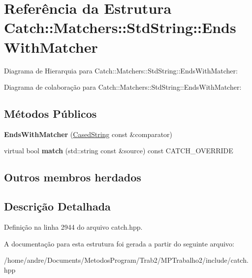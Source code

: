 \hypertarget{structCatch_1_1Matchers_1_1StdString_1_1EndsWithMatcher}{}\section{Referência da Estrutura Catch\+:\+:Matchers\+:\+:Std\+String\+:\+:Ends\+With\+Matcher}
\label{structCatch_1_1Matchers_1_1StdString_1_1EndsWithMatcher}


Diagrama de Hierarquia para Catch\+:\+:Matchers\+:\+:Std\+String\+:\+:Ends\+With\+Matcher\+:


Diagrama de colaboração para Catch\+:\+:Matchers\+:\+:Std\+String\+:\+:Ends\+With\+Matcher\+:
\subsection*{Métodos Públicos}
\begin{DoxyCompactItemize}
\item 
{\bfseries Ends\+With\+Matcher} (\hyperlink{structCatch_1_1Matchers_1_1StdString_1_1CasedString}{Cased\+String} const \&comparator)\hypertarget{structCatch_1_1Matchers_1_1StdString_1_1EndsWithMatcher_aa5ec700b4629562f74f362080accfd7b}{}\label{structCatch_1_1Matchers_1_1StdString_1_1EndsWithMatcher_aa5ec700b4629562f74f362080accfd7b}

\item 
virtual bool {\bfseries match} (std\+::string const \&source) const C\+A\+T\+C\+H\+\_\+\+O\+V\+E\+R\+R\+I\+DE\hypertarget{structCatch_1_1Matchers_1_1StdString_1_1EndsWithMatcher_a21c6dc68e30716d5c718f4f8c3186af1}{}\label{structCatch_1_1Matchers_1_1StdString_1_1EndsWithMatcher_a21c6dc68e30716d5c718f4f8c3186af1}

\end{DoxyCompactItemize}
\subsection*{Outros membros herdados}


\subsection{Descrição Detalhada}


Definição na linha 2944 do arquivo catch.\+hpp.



A documentação para esta estrutura foi gerada a partir do seguinte arquivo\+:\begin{DoxyCompactItemize}
\item 
/home/andre/\+Documents/\+Metodos\+Program/\+Trab2/\+M\+P\+Trabalho2/include/catch.\+hpp\end{DoxyCompactItemize}
